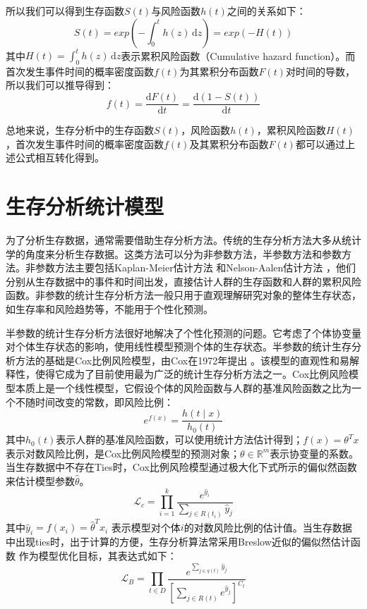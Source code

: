 所以我们可以得到生存函数$S(t)$与风险函数$h(t)$之间的关系如下：
\begin{equation}
S(t)=exp⁡\left(-\int_0^{t} h(z)\,\mathrm{d}z\right)=exp⁡(-H(t)) \label{F2}
\end{equation}
其中$H(t)=\int_0^{t} h(z)\,\mathrm{d}z$表示累积风险函数（Cumulative hazard function）。而首次发生事件时间的概率密度函数$f(t)$为其累积分布函数$F(t)$对时间的导数，所以我们可以推导得到：
\begin{equation}
f(t)=\frac{\mathrm{d}F(t)}{\mathrm{d}t}=\frac{\mathrm{d}(1-S(t))}{\mathrm{d}t} \label{F3}
\end{equation}

总地来说，生存分析中的生存函数$S(t)$，风险函数$h(t)$，累积风险函数$H(t)$，首次发生事件时间的概率密度函数$f(t)$及其累积分布函数$F(t)$都可以通过上述公式相互转化得到。

\section{生存分析统计模型}

为了分析生存数据，通常需要借助生存分析方法。传统的生存分析方法大多从统计学的角度来分析生存数据。这类方法可以分为非参数方法，半参数方法和参数方法。非参数方法主要包括Kaplan-Meier估计方法  和Nelson-Aalen估计方法 ，他们分别从生存数据中的事件和时间出发，直接估计人群的生存函数和人群的累积风险函数。非参数的统计生存分析方法一般只用于直观理解研究对象的整体生存状态，如生存率和风险趋势等，不能用于个性化预测。

半参数的统计生存分析方法很好地解决了个性化预测的问题。它考虑了个体协变量对个体生存状态的影响，使用线性模型预测个体的生存状态。半参数的统计生存分析方法的基础是Cox比例风险模型，由Cox在1972年提出 。该模型的直观性和易解释性，使得它成为了目前使用最为广泛的统计生存分析方法之一。Cox比例风险模型本质上是一个线性模型，它假设个体的风险函数与人群的基准风险函数之比为一个不随时间改变的常数，即风险比例：
\begin{equation}
e^{f(x)} =\frac{h(t\mid x)}{h_0 (t)} \label{F4}
\end{equation}
其中$h_0 (t)$表示人群的基准风险函数，可以使用统计方法估计得到；$f(x)=\theta^T x$表示对数风险比例，是Cox比例风险模型的预测对象；$\theta \in \mathbb{R}^m$表示协变量的系数。当生存数据中不存在Ties时，Cox比例风险模型通过极大化下式所示的偏似然函数 来估计模型参数$\hat{\theta}$。
\begin{equation}
\mathcal{L}_c = \prod_{i=1}^k \frac{e^{\hat{y}_i}}{\sum_{j\in R(t_i)} \hat{y}_j} \label{F5}
\end{equation}
其中$\hat{y}_i=f(x_i)=\hat{\theta}^T x_i$ 表示模型对个体$i$的对数风险比例的估计值。当生存数据中出现ties时，出于计算的方便，生存分析算法常采用Breslow近似的偏似然估计函数 作为模型优化目标，其表达式如下：
\begin{equation}
\mathcal{L}_B = \prod_{t\in D} \frac{e^{\sum_{j\in q(t)} \hat{y}_j}}{[\sum_{j\in R(t)} e^{\hat{y}_j}]^{C_t}} \label{F6}
\end{equation}


